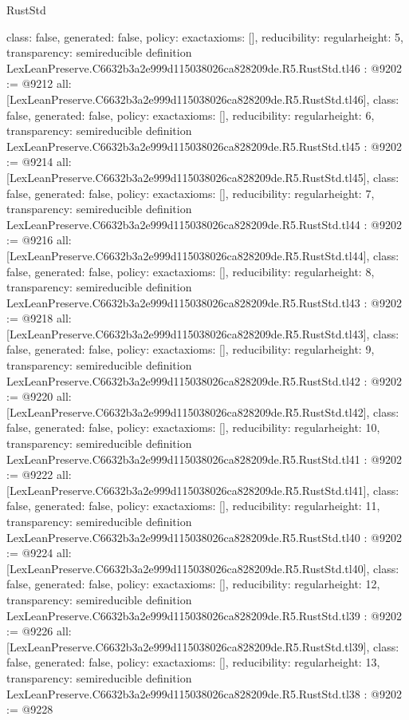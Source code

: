\begin{lexlean}{RustStd}
\begin{coremodule}
{  class: false,
  generated: false,
  policy: exact{axioms: []},
  reducibility: regular{height: 5},
  transparency: semireducible
}
definition LexLeanPreserve.C6632b3a2e999d115038026ca828209de.R5.RustStd.tl46 : @9202 := @9212 {
  all: [LexLeanPreserve.C6632b3a2e999d115038026ca828209de.R5.RustStd.tl46],
  class: false,
  generated: false,
  policy: exact{axioms: []},
  reducibility: regular{height: 6},
  transparency: semireducible
}
definition LexLeanPreserve.C6632b3a2e999d115038026ca828209de.R5.RustStd.tl45 : @9202 := @9214 {
  all: [LexLeanPreserve.C6632b3a2e999d115038026ca828209de.R5.RustStd.tl45],
  class: false,
  generated: false,
  policy: exact{axioms: []},
  reducibility: regular{height: 7},
  transparency: semireducible
}
definition LexLeanPreserve.C6632b3a2e999d115038026ca828209de.R5.RustStd.tl44 : @9202 := @9216 {
  all: [LexLeanPreserve.C6632b3a2e999d115038026ca828209de.R5.RustStd.tl44],
  class: false,
  generated: false,
  policy: exact{axioms: []},
  reducibility: regular{height: 8},
  transparency: semireducible
}
definition LexLeanPreserve.C6632b3a2e999d115038026ca828209de.R5.RustStd.tl43 : @9202 := @9218 {
  all: [LexLeanPreserve.C6632b3a2e999d115038026ca828209de.R5.RustStd.tl43],
  class: false,
  generated: false,
  policy: exact{axioms: []},
  reducibility: regular{height: 9},
  transparency: semireducible
}
definition LexLeanPreserve.C6632b3a2e999d115038026ca828209de.R5.RustStd.tl42 : @9202 := @9220 {
  all: [LexLeanPreserve.C6632b3a2e999d115038026ca828209de.R5.RustStd.tl42],
  class: false,
  generated: false,
  policy: exact{axioms: []},
  reducibility: regular{height: 10},
  transparency: semireducible
}
definition LexLeanPreserve.C6632b3a2e999d115038026ca828209de.R5.RustStd.tl41 : @9202 := @9222 {
  all: [LexLeanPreserve.C6632b3a2e999d115038026ca828209de.R5.RustStd.tl41],
  class: false,
  generated: false,
  policy: exact{axioms: []},
  reducibility: regular{height: 11},
  transparency: semireducible
}
definition LexLeanPreserve.C6632b3a2e999d115038026ca828209de.R5.RustStd.tl40 : @9202 := @9224 {
  all: [LexLeanPreserve.C6632b3a2e999d115038026ca828209de.R5.RustStd.tl40],
  class: false,
  generated: false,
  policy: exact{axioms: []},
  reducibility: regular{height: 12},
  transparency: semireducible
}
definition LexLeanPreserve.C6632b3a2e999d115038026ca828209de.R5.RustStd.tl39 : @9202 := @9226 {
  all: [LexLeanPreserve.C6632b3a2e999d115038026ca828209de.R5.RustStd.tl39],
  class: false,
  generated: false,
  policy: exact{axioms: []},
  reducibility: regular{height: 13},
  transparency: semireducible
}
definition LexLeanPreserve.C6632b3a2e999d115038026ca828209de.R5.RustStd.tl38 : @9202 := @9228 {
}
\end{coremodule}
\end{lexlean}
